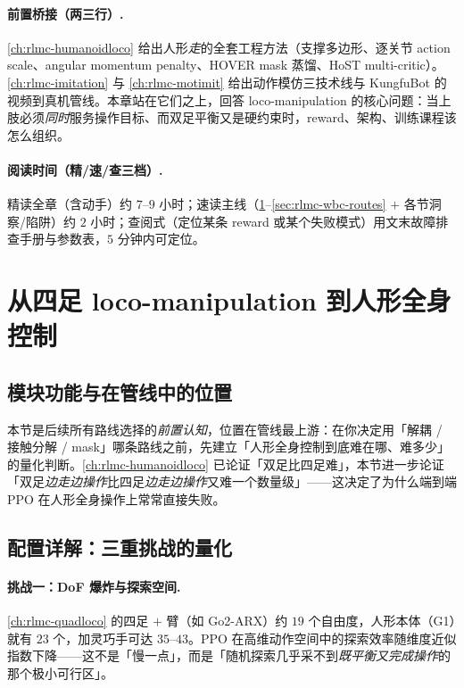 \paragraph{前置桥接（两三行）.}
\cref{ch:rlmc-humanoidloco} 给出人形\emph{走}的全套工程方法（支撑多边形、逐关节 action scale、angular momentum penalty、HOVER mask 蒸馏、HoST multi-critic）。\cref{ch:rlmc-imitation} 与 \cref{ch:rlmc-motimit} 给出动作模仿三技术线与 KungfuBot 的视频到真机管线。本章站在它们之上，回答 loco-manipulation 的核心问题：当上肢必须\emph{同时}服务操作目标、而双足平衡又是硬约束时，reward、架构、训练课程该怎么组织。

\paragraph{阅读时间（精/速/查三档）.}
精读全章（含动手）约 $7$--$9$ 小时；速读主线（\cref{sec:rlmc-wbc-challenge}--\cref{sec:rlmc-wbc-routes} $+$ 各节洞察/陷阱）约 $2$ 小时；查阅式（定位某条 reward 或某个失败模式）用文末故障排查手册与参数表，$5$ 分钟内可定位。

\section{从四足 loco-manipulation 到人形全身控制}\label{sec:rlmc-wbc-challenge}

\subsection{模块功能与在管线中的位置}
本节是后续所有路线选择的\emph{前置认知}，位置在管线最上游：在你决定用「解耦 / 接触分解 / mask」哪条路线之前，先建立「人形全身控制到底难在哪、难多少」的量化判断。\cref{ch:rlmc-humanoidloco} 已论证「双足比四足难」，本节进一步论证「双足\emph{边走边操作}比四足\emph{边走边操作}又难一个数量级」——这决定了为什么端到端 PPO 在人形全身操作上常常直接失败。

\subsection{配置详解：三重挑战的量化}

\paragraph{挑战一：DoF 爆炸与探索空间.}
\cref{ch:rlmc-quadloco} 的四足 $+$ 臂（如 Go2-ARX）约 $19$ 个自由度，人形本体（G1）就有 $23$ 个，加灵巧手可达 $35$--$43$。PPO 在高维动作空间中的探索效率随维度近似指数下降——这不是「慢一点」，而是「随机探索几乎采不到\emph{既平衡又完成操作}的那个极小可行区」。

